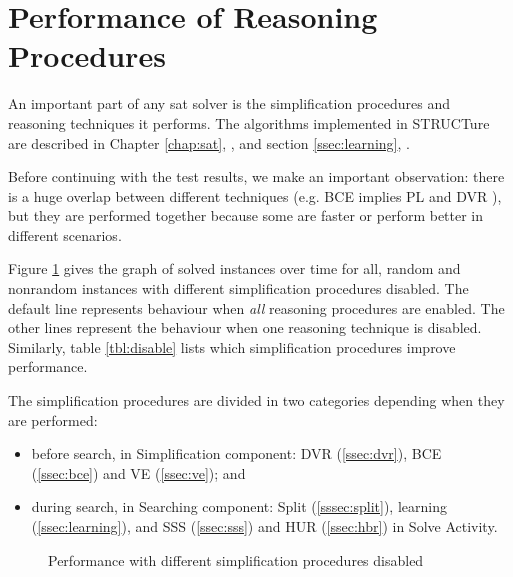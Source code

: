 \section{Performance of Reasoning Procedures}
\label{sec:perf-reasoning}

An important part of any sat solver is the simplification
procedures and reasoning techniques it performs. The algorithms
implemented in STRUCTure are described in Chapter \ref{chap:sat},
, and section \ref{ssec:learning},
.

Before continuing with the test results, we make an important
observation: there is a huge overlap between different techniques
(e.g. BCE implies PL and DVR \cite{Jarvisalo_blockedclause}),
but they are performed together because some are faster or perform
better in different scenarios.

Figure \ref{fig:disable} gives the graph of solved instances
over time for all, random and nonrandom instances with different
simplification procedures disabled.  The default line represents
behaviour when \emph{all} reasoning procedures are enabled. The
other lines represent the behaviour when one reasoning technique
is disabled. Similarly, table \ref{tbl:disable} lists which
simplification procedures improve performance.

The simplification procedures are divided in two categories
depending when they are performed:
\begin{itemize}
  \item before search, in Simplification component:
  DVR (\ref{ssec:dvr}), BCE (\ref{ssec:bce}) and VE (\ref{ssec:ve}); and
  \item during search, in Searching component:
  Split (\ref{sssec:split}), learning (\ref{ssec:learning}),
  and SSS (\ref{ssec:sss}) and HUR (\ref{ssec:hbr}) in Solve Activity.
\end{itemize}

\begin{figure}
  \centering
  \caption{Performance with different simplification procedures disabled}
  \label{fig:disable}
\end{figure}

